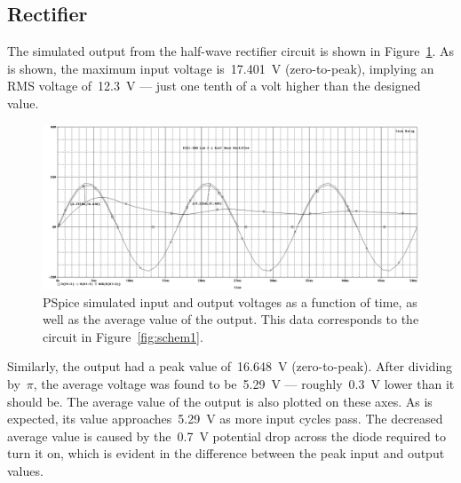 \subsection{Rectifier}
\newcommand{\pwidth}{.95\textwidth}

The simulated output from the half-wave rectifier circuit is shown in
Figure~\ref{fig:halfwavePlotV}.  As is shown, the maximum input voltage
is~\SI{17.401}{\volt} (zero-to-peak), implying an RMS voltage
of~\SI{12.3}{\volt} --- just one tenth of a volt higher than the designed value.
%
\begin{figure}[H]
	\centering
	\includegraphics[width=\pwidth]{img/plot/halfwavePlot.PNG}
	\parbox{\pwidth}{
	\caption[PSpice Plot --- Half-wave Rectifier (Voltage)]{PSpice simulated
		input and output voltages as a function of time, as well as the average
		value of the output.  This data corresponds to the circuit in
		Figure~\ref{fig:schem1}.}
	\label{fig:halfwavePlotV}}
\end{figure}
%
Similarly, the output had a peak value of~\SI{16.648}{\volt} (zero-to-peak).
After dividing by~$\pi$, the average voltage was found to be~\SI{5.29}{\volt}
--- roughly~\SI{0.3}{\volt} lower than it should be.  The average value of the
output is also plotted on these axes.  As is expected, its value
approaches~\SI{5.29}{\volt} as more input cycles pass.  The decreased average
value is caused by the~\SI{0.7}{\volt} potential drop across the diode required
to turn it on, which is evident in the difference between the peak input and
output values.

